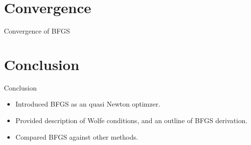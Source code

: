 \documentclass{beamer}
\begin{document}
\section{Convergence}
\begin{frame}{Convergence of BFGS}
	\begin{itemize}
	\end{itemize}
\end{frame}

\section{Conclusion}
\begin{frame}{Conclusion}
	\begin{itemize}
		\item Introduced BFGS as an quasi Newton optimzer.
		\item Provided description of Wolfe conditions, and an outline of BFGS derivation.
		\item Compared BFGS against other methods.
	\end{itemize}
\end{frame}
\end{document}
